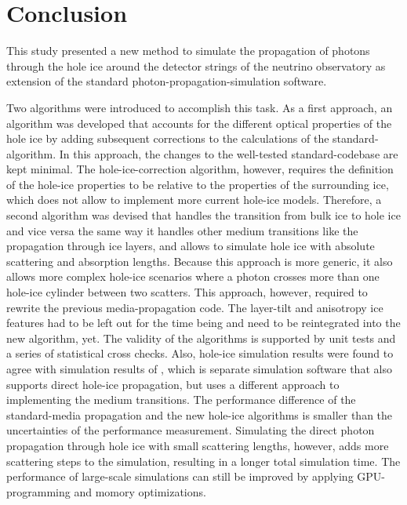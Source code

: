 
\section{Conclusion}
\label{sec:conclusion}

This study presented a new method to simulate the propagation of photons through the hole ice around the detector strings of the \icecube neutrino observatory as extension of the standard \clsim photon-propagation-simulation software.

Two algorithms were introduced to accomplish this task.
As a first approach, an algorithm was developed that accounts for the different optical properties of the hole ice by adding subsequent corrections to the calculations of the standard-\clsim algorithm.
In this approach, the changes to the well-tested standard-\clsim codebase are kept minimal.
The hole-ice-correction algorithm, however, requires the definition of the hole-ice properties to be relative to the properties of the surrounding ice, which does not allow to implement more current hole-ice models.
Therefore, a second algorithm was devised that handles the transition from bulk ice to hole ice and vice versa the same way it handles other medium transitions like the propagation through ice layers, and allows to simulate hole ice with absolute scattering and absorption lengths.
Because this approach is more generic, it also allows more complex hole-ice scenarios where a photon crosses more than one hole-ice cylinder between two scatters.
This approach, however, required to rewrite the previous \clsim media-propagation code.
The layer-tilt and anisotropy ice features had to be left out for the time being and need to be reintegrated into the new algorithm, yet.
The validity of the algorithms is supported by unit tests and a series of statistical cross checks.
Also, \clsim hole-ice simulation results were found to agree with simulation results of \ppc, which is separate \icecube simulation software that also supports direct hole-ice propagation, but uses a different approach to implementing the medium transitions.
The performance difference of the standard-\clsim media propagation and the new hole-ice algorithms is smaller than the uncertainties of the performance measurement.
Simulating the direct photon propagation through hole ice with small scattering lengths, however, adds more scattering steps to the simulation, resulting in a longer total simulation time.
The performance of large-scale simulations can still be improved by applying GPU-programming and momory optimizations.

